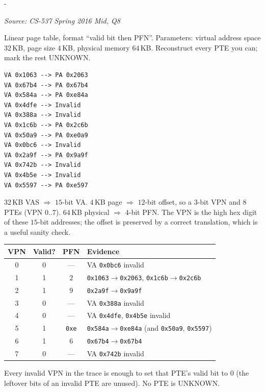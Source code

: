 \documentclass[11pt,a4paper]{article}
\makeatletter
\newcommand{\keepspace}[1]{\par\penalty-100\begingroup
  \setlength{\dimen@}{#1}\dimen@ii\pagegoal\advance\dimen@ii-\pagetotal
  \ifdim\dimen@>\dimen@ii\ifdim\dimen@ii>\z@\vfil\fi\break\fi\endgroup}
\newcounter{qn}[section]
\newenvironment{Qn}[4]{%
  \refstepcounter{qn}\keepspace{7\baselineskip}%
  \begin{tcolorbox}[qboxstyle, title={Q\thesection.\theqn\ \ [#1 \textbar\ #2]\ \ #4}]%
  {\footnotesize\color{g3}\textit{Source: #3}}\par\smallskip%
}{%
  \end{tcolorbox}%
}
\newenvironment{Sol}{%
  \begin{tcolorbox}[sboxstyle, title={Solution}]%
}{%
  \end{tcolorbox}\vspace{0.35em}%
}
\makeatother
\begin{document}
\begin{Qn}{Hard}{Lect 12}{CS-537 Spring 2016 Mid, Q8}{Reverse-engineer a linear page table from a VA/PA trace}
Linear page table, format ``valid bit then PFN''. Parameters:
virtual address space $32$\,KB, page size $4$\,KB, physical memory
$64$\,KB. Reconstruct every PTE you can; mark the rest UNKNOWN.

\begin{lstlisting}[numbers=none]
VA 0x1063 --> PA 0x2063
VA 0x67b4 --> PA 0x67b4
VA 0x584a --> PA 0xe84a
VA 0x4dfe --> Invalid
VA 0x388a --> Invalid
VA 0x1c6b --> PA 0x2c6b
VA 0x50a9 --> PA 0xe0a9
VA 0x0bc6 --> Invalid
VA 0x2a9f --> PA 0x9a9f
VA 0x742b --> Invalid
VA 0x4b5e --> Invalid
VA 0x5597 --> PA 0xe597
\end{lstlisting}
\end{Qn}
\begin{Sol}
$32$\,KB VAS $\Rightarrow$ $15$-bit VA. $4$\,KB page $\Rightarrow$
$12$-bit offset, so a $3$-bit VPN and $8$ PTEs (VPN $0..7$).
$64$\,KB physical $\Rightarrow$ $4$-bit PFN. The VPN is the high hex
digit of these $15$-bit addresses; the offset is preserved by a
correct translation, which is a useful sanity check.

\begin{center}
\begin{tabular}{c|c|c|l}
VPN & Valid? & PFN & Evidence \\
\hline
0 & 0 & --- & VA \texttt{0x0bc6} invalid \\
1 & 1 & $2$ & \texttt{0x1063}$\to$\texttt{0x2063},
              \texttt{0x1c6b}$\to$\texttt{0x2c6b} \\
2 & 1 & $9$ & \texttt{0x2a9f}$\to$\texttt{0x9a9f} \\
3 & 0 & --- & VA \texttt{0x388a} invalid \\
4 & 0 & --- & VA \texttt{0x4dfe}, \texttt{0x4b5e} invalid \\
5 & 1 & \texttt{0xe} & \texttt{0x584a}$\to$\texttt{0xe84a} (and
                      \texttt{0x50a9}, \texttt{0x5597}) \\
6 & 1 & $6$ & \texttt{0x67b4}$\to$\texttt{0x67b4} \\
7 & 0 & --- & VA \texttt{0x742b} invalid \\
\end{tabular}
\end{center}

Every invalid VPN in the trace is enough to set that PTE's valid bit
to $0$ (the leftover bits of an invalid PTE are unused). No PTE is
UNKNOWN.
\end{Sol}
\end{document}
